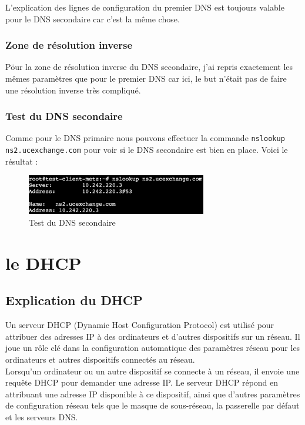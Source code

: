 \documentclass[12pt, a4paper]{article}
\begin{document}
    L'explication des lignes de configuration du premier DNS est toujours valable
    pour le DNS secondaire car c'est la même chose. 

    \subsubsection{Zone de résolution inverse}

    Pöur la zone de résolution inverse du DNS secondaire, j'ai repris exactement 
    les mêmes paramètres que pour le premier DNS car ici, le but n'était pas de 
    faire une résolution inverse très compliqué. 

    \subsubsection{Test du DNS secondaire}
    Comme pour le DNS primaire nous pouvons effectuer la commande 
    \texttt{nslookup ns2.ucexchange.com} pour voir si le DNS secondaire est
    bien en place. Voici le résultat :

    \begin{figure}[h]
		\centering
		\includegraphics[width=0.7\textwidth]{img/nslook.png}
		\caption{Test du DNS secondaire}
		\label{fig:nslook}
	\end{figure}



\section{le DHCP}
    \subsection{Explication du DHCP}
    Un serveur DHCP (Dynamic Host Configuration Protocol) est utilisé 
    pour attribuer des adresses IP à des ordinateurs et d'autres dispositifs 
    sur un réseau. Il joue un rôle clé dans la configuration automatique des 
    paramètres réseau pour les ordinateurs et autres dispositifs connectés au 
    réseau.\\

    Lorsqu'un ordinateur ou un autre dispositif se connecte à un réseau, 
    il envoie une requête DHCP pour demander une adresse IP. Le serveur DHCP 
    répond en attribuant une adresse IP disponible à ce dispositif, ainsi que 
    d'autres paramètres de configuration réseau tels que le masque de 
    sous-réseau, la passerelle par défaut et les serveurs DNS.\\
\end{document}
